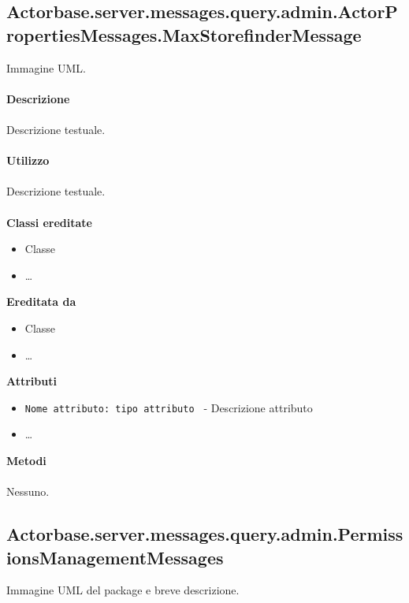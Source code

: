 \documentclass[a4paper]{article}
\begin{document}
\subsection{Actorbase.server.messages.query.admin.ActorPropertiesMessages.MaxStorefinderMessage}
		Immagine UML.
		\\ \\
		\textbf{Descrizione}
			\\ \\
			Descrizione testuale.
			\\ \\
		\textbf{Utilizzo}
			\\ \\
			Descrizione testuale.
			\\ \\
		\textbf{Classi ereditate}
			\begin{itemize}
				\item Classe
				\item \dots
			\end{itemize}
		\textbf{Ereditata da}
			\begin{itemize}
				\item Classe
				\item \dots
			\end{itemize}
		\textbf{Attributi}
			\begin{itemize}
				\item \texttt{Nome attributo: tipo attributo } - Descrizione attributo
				\item \dots
			\end{itemize}
		\textbf{Metodi}
			\\ \\
			Nessuno.
			
	\subsection{Actorbase.server.messages.query.admin.PermissionsManagementMessages}
		Immagine UML del package e breve descrizione.
		
\end{document}
